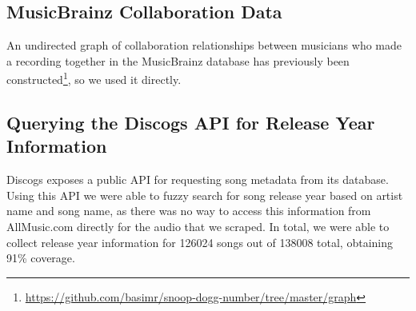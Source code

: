 \subsection*{MusicBrainz Collaboration Data}
An undirected graph of collaboration relationships between musicians who made a recording together in the MusicBrainz database has previously been constructed\footnote{\url{https://github.com/basimr/snoop-dogg-number/tree/master/graph}}, so we used it directly.

\subsection*{Querying the Discogs API for Release Year Information}
Discogs exposes a public API for requesting song metadata from its database. Using this API we were able to fuzzy search for song release year based on artist name and song name, as there was no way to access this information from AllMusic.com directly for the audio that we scraped. In total, we were able to collect release year information for 126024 songs out of 138008 total, obtaining 91\% coverage. 
